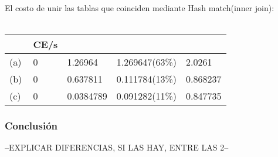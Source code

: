 El costo de unir las tablas que coinciden mediante Hash match(inner join): \\ \\

\begin{tabular}{| L | L | L | L | L |}
    \hline
     & CE/s &  &  &  \\ \hline
    (a) & 0 & 1.26964 & 1.269647(63\%) & 2.0261 \\ \hline
    (b) & 0 & 0.637811 & 0.111784(13\%) & 0.868237 \\ \hline
    (c) & 0 & 0.0384789 & 0.091282(11\%) & 0.847735 \\ \hline
\end{tabular}
			
			
			


\subsubsection{Conclusión}

--EXPLICAR DIFERENCIAS, SI LAS HAY, ENTRE LAS 2--

